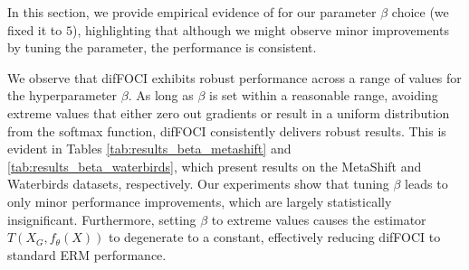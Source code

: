 \begin{table}[t]
    \centering
    \setlength{\tabcolsep}{4pt}  %
        \caption{Results for various $\beta$ on MetaShift dataset. The results for reasonable values of $\beta$ yield similar performance, and very large or small values result the performance falling back to the standard ERM or DRO performance.}
    \label{tab:results_beta_metashift}

\end{table}



In this section, we provide empirical evidence of for our parameter $\beta$ choice (we fixed it to $5$), highlighting that although we might observe minor improvements by tuning the parameter, the performance is consistent. 

We observe that difFOCI exhibits robust performance across a range of values for the hyperparameter $\beta$. As long as $\beta$ is set within a reasonable range, avoiding extreme values that either zero out gradients or result in a uniform distribution from the softmax function, difFOCI consistently delivers robust results. This is evident in Tables \ref{tab:results_beta_metashift} and \ref{tab:results_beta_waterbirds}, which present results on the MetaShift and Waterbirds datasets, respectively. Our experiments show that tuning $\beta$ leads to only minor performance improvements, which are largely statistically insignificant. Furthermore, setting $\beta$ to extreme values causes the estimator $T(X_G, f_\theta(X))$ to degenerate to a constant, effectively reducing difFOCI to standard ERM performance.



